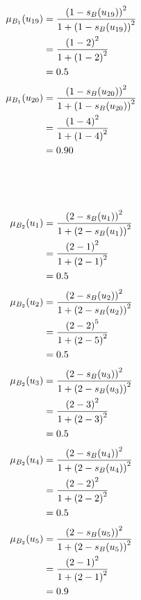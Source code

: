\documentclass[a4paper]{book}
\begin{document}
				\begin{align}
					\mu_{B_1}(u_{19}) &= \frac{\left(1-s_B(u_{19})\right)^2}{1 + \left(1-s_B(u_{19})\right)^2}\\
					&= \frac{\left(1-2\right)^2}{1 + \left(1-2\right)^2} \notag \\
					&= 0.5 \notag
				\end{align}
				\begin{align}
					\mu_{B_1}(u_{20}) &= \frac{\left(1-s_B(u_{20})\right)^2}{1 + \left(1-s_B(u_{20})\right)^2}\\
					&= \frac{\left(1-4\right)^2}{1 + \left(1-4\right)^2} \notag \\
					&= 0.90 \notag
				\end{align}
				\\
				\\
				\\
				\begin{align}
					\mu_{B_2}(u_1) &= \frac{\left(2-s_B(u_1)\right)^2}{1 + \left(2-s_B(u_1)\right)^2}\\
					&= \frac{\left(2-1\right)^2}{1 + \left(2-1\right)^2} \notag \\
					&= 0.5 \notag
				\end{align}
				\begin{align}
					\mu_{B_2}(u_2) &= \frac{\left(2-s_B(u_2)\right)^2}{1 + \left(2-s_B(u_2)\right)^2}\\
					&= \frac{\left(2-2\right)^5}{1 + \left(2-5\right)^2} \notag \\
					&= 0.5 \notag
				\end{align}
				\begin{align}
					\mu_{B_2}(u_3) &= \frac{\left(2-s_B(u_3)\right)^2}{1 + \left(2-s_B(u_3)\right)^2}\\
					&= \frac{\left(2-3\right)^2}{1 + \left(2-3\right)^2} \notag \\
					&= 0.5 \notag
				\end{align}
				\begin{align}
					\mu_{B_2}(u_4) &= \frac{\left(2-s_B(u_4)\right)^2}{1 + \left(2-s_B(u_4)\right)^2}\\
					&= \frac{\left(2-2\right)^2}{1 + \left(2-2\right)^2} \notag \\
					&= 0.5 \notag
				\end{align}
				\begin{align}
					\mu_{B_2}(u_5) &= \frac{\left(2-s_B(u_5)\right)^2}{1 + \left(2-s_B(u_5)\right)^2}\\
					&= \frac{\left(2-1\right)^2}{1 + \left(2-1\right)^2} \notag \\
					&= 0.9 \notag
				\end{align}
\end{document}
